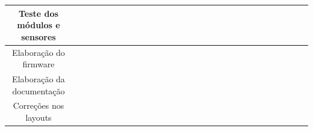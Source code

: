 \begin{table}[h!]
{\begin{tabular}{|c|cccc|cccc|cccc|cccc|cccc|cccc|cccc|}
Teste dos módulos e sensores  &  &                          &                          &                          & \cellcolor[HTML]{3166FF} & \cellcolor[HTML]{3166FF} &                          &                          &                          &                          &                          &                          &                          &                          &                          &                          &                          &                          &                          &                          &                          &                          &                          &                          &                          &  &  &  \\ \hline
Elaboração do firmware        &  &                          &                          &                          &                          & \cellcolor[HTML]{3166FF} & \cellcolor[HTML]{3166FF} & \cellcolor[HTML]{3166FF} & \cellcolor[HTML]{3166FF} & \cellcolor[HTML]{3166FF} &                          &                          &                          &                          &                          &                          &                          &                          &                          &                          &                          &                          &                          &                          &                          &  &  &  \\ \hline
Elaboração da documentação    &  &                          &                          &                          &                          &                          &                          & \cellcolor[HTML]{3166FF} & \cellcolor[HTML]{3166FF} & \cellcolor[HTML]{3166FF} & \cellcolor[HTML]{3166FF} & \cellcolor[HTML]{3166FF} &                          &                          &                          &                          &                          &                          &                          &                          &                          &                          &                          &                          &                          &  &  &  \\ \hline
Correções nos layouts         &  &                          &                          &                          &                          &                          &                          &                          &                          &                          &                          &                          & \cellcolor[HTML]{3166FF} & \cellcolor[HTML]{3166FF} &                          &                          &                          &                          & \cellcolor[HTML]{3166FF} & \cellcolor[HTML]{3166FF} &                          &                          &                          &                          &                          &  &  &  \\ \hline

\end{tabular}}
\end{table}
